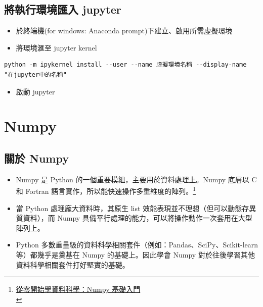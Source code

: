 \documentclass[a4paper,12pt]{article}
\begin{document}
\subsection{將執行環境匯入 jupyter}
\label{sec:org27992a3}
\begin{itemize}
\item 於終端機(for windows: Anaconda prompt)下建立、啟用所需虛擬環境\\
\item 將環境滙至 jupyter kernel\\
\end{itemize}
\lstset{breaklines=true,language=shell,label= ,caption= ,captionpos=b,numbers=none}
\begin{lstlisting}
python -m ipykernel install --user --name 虛擬環境名稱 --display-name "在jupyter中的名稱"
\end{lstlisting}
\begin{itemize}
\item 啟動 jupyter\\
\end{itemize}
\newpage

\section{Numpy}
\label{sec:org6006197}
\subsection{關於 Numpy}
\label{sec:org5b764d6}
\begin{itemize}
\item Numpy 是 Python 的一個重要模組，主要用於資料處理上。Numpy 底層以 C 和 Fortran 語言實作，所以能快速操作多重維度的陣列。\footnote{\href{https://blog.techbridge.cc/2017/07/28/data-science-101-numpy-tutorial/}{從零開始學資料科學：Numpy 基礎入門}\\\label{orgc4061f5}}\\
\item 當 Python 處理龐大資料時，其原生 list 效能表現並不理想（但可以動態存異質資料），而 Numpy 具備平行處理的能力，可以將操作動作一次套用在大型陣列上。\\
\item Python 多數重量級的資料科學相關套件（例如：Pandas、SciPy、Scikit-learn 等）都幾乎是奠基在 Numpy 的基礎上。因此學會 Numpy 對於往後學習其他資料科學相關套件打好堅實的基礎。\\
\end{itemize}
\end{document}
